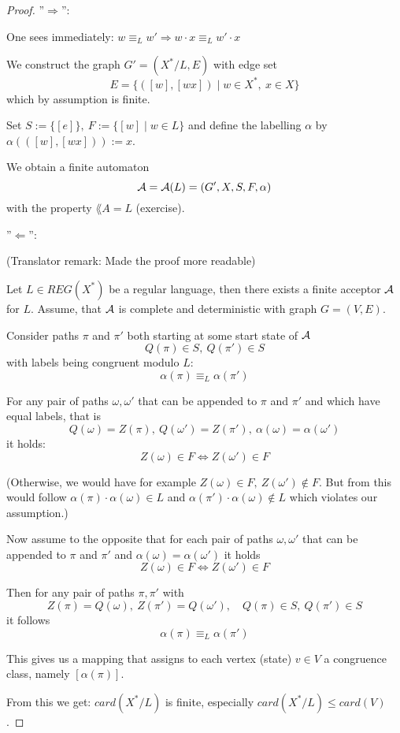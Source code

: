 \begin{proof}
''$\Rightarrow$'':

One sees immediately: $w \equiv_L w' \Rightarrow w \cdot x \equiv_L w' \cdot x$

We construct the graph $G' = (X^*/L, E)$ with edge set
\[ E = \{ ([w], [wx]) \mid w \in X^*,\ x \in X \} \]
which by assumption is finite.

Set $S := \{ [e] \},\ F := \{[w] \mid w\in L \}$ and define the labelling
$\alpha$ by $\alpha(([w], [wx])) := x$.

We obtain a finite automaton \[ \mbox{$\mathcal{A}$} = \mbox{$\mathcal{A}$}(L) = (G', X, S, F, \alpha) \]
with the property $\lang{A} = L$ (exercise).

''$\Leftarrow$'':

(Translator remark: Made the proof more readable)

Let $L \in REG(X^*)$ be a regular language, then there exists a finite acceptor
$\mbox{$\mathcal{A}$}$ for $L$. Assume, that $\mbox{$\mathcal{A}$}$ is complete and deterministic with graph
$G = (V, E)$.

Consider paths $\pi$ and $\pi'$ both starting at some start state of $\mbox{$\mathcal{A}$}$
\[ Q(\pi) \in S,\ Q(\pi')\in S \]
with labels being congruent modulo $L$:
\[ \alpha(\pi) \equiv_L \alpha(\pi') \]

For any pair of paths $\omega, \omega'$ that can be appended to $\pi$ and $\pi'$
and which have equal labels, that is
\[ Q(\omega) = Z(\pi),\ Q(\omega') = Z(\pi'),\ \alpha(\omega) = \alpha(\omega')
\] it holds: \[ Z(\omega) \in F \iff Z(\omega') \in F \]

(Otherwise, we would have for example $Z(\omega) \in F,\ Z(\omega') \notin F$.
But from this would follow $\alpha(\pi) \cdot \alpha(\omega) \in L$ and
$\alpha(\pi') \cdot \alpha(\omega) \notin L$ which violates our assumption.)

Now assume to the opposite that for each pair of paths $\omega,
\omega'$ that can be appended to $\pi$ and $\pi'$ and $\alpha(\omega) =
\alpha(\omega')$ it holds \[ Z(\omega) \in F \iff Z(\omega') \in F \]

Then for any pair of paths $\pi, \pi'$ with 
\[Z(\pi) = Q(\omega),\ Z(\pi') = Q(\omega'),\quad Q(\pi)\in S,\ Q(\pi') \in S \]
it follows 
\[ \alpha(\pi) \equiv_L \alpha(\pi') \]

This gives us a mapping that assigns to each vertex (state) $v \in V$ a
congruence class, namely $[\alpha(\pi)]$.

From this we get: $card(X^*/L)$ is finite, especially $card(X^*/L) \leq
card(V)$.
\end{proof}

